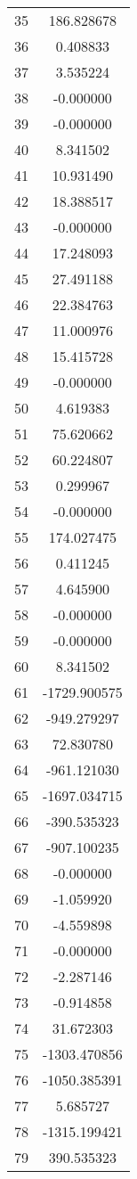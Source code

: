 \documentclass[12pt]{article}
\begin{document}
\begin{longtable}{@{}cc@{}}
35 & 186.828678 \\
36 & 0.408833 \\
37 & 3.535224 \\
38 & -0.000000 \\
39 & -0.000000 \\
40 & 8.341502 \\
41 & 10.931490 \\
42 & 18.388517 \\
43 & -0.000000 \\
44 & 17.248093 \\
45 & 27.491188 \\
46 & 22.384763 \\
47 & 11.000976 \\
48 & 15.415728 \\
49 & -0.000000 \\
50 & 4.619383 \\
51 & 75.620662 \\
52 & 60.224807 \\
53 & 0.299967 \\
54 & -0.000000 \\
55 & 174.027475 \\
56 & 0.411245 \\
57 & 4.645900 \\
58 & -0.000000 \\
59 & -0.000000 \\
60 & 8.341502 \\
61 & -1729.900575 \\
62 & -949.279297 \\
63 & 72.830780 \\
64 & -961.121030 \\
65 & -1697.034715 \\
66 & -390.535323 \\
67 & -907.100235 \\
68 & -0.000000 \\
69 & -1.059920 \\
70 & -4.559898 \\
71 & -0.000000 \\
72 & -2.287146 \\
73 & -0.914858 \\
74 & 31.672303 \\
75 & -1303.470856 \\
76 & -1050.385391 \\
77 & 5.685727 \\
78 & -1315.199421 \\
79 & 390.535323 \\

\end{longtable}
\end{document}
